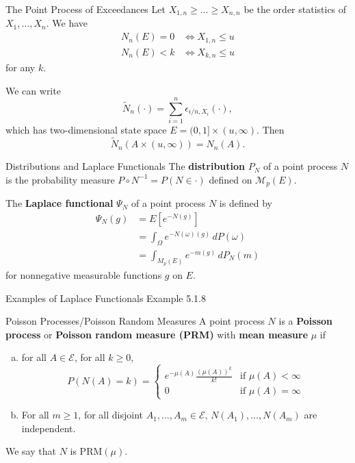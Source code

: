 \documentclass{beamer}
\begin{document}
\begin{frame}{The Point Process of Exceedances}
    Let $X_{1, n} \ge \ldots \ge X_{n, n}$ be the order statistics of $X_1, \ldots, X_n$. We have
    \begin{align*}
        N_n(E) = 0 &\iff X_{1, n} \le u \\
        N_n(E) < k &\iff X_{k, n} \le u
    \end{align*}
    for any $k$.

    \smallskip

    We can write
    \[
    \tilde{N}_n(\cdot) = \sum_{i = 1}^n \epsilon_{i / n, X_i}(\cdot),
    \]
    which has two-dimensional state space $E = (0, 1] \times (u, \infty)$. Then
    \[
    \tilde{N}_n(A \times (u, \infty)) = N_n(A).
    \]
\end{frame}

\begin{frame}{Distributions and Laplace Functionals}
    The \textbf{distribution} $P_N$ of a point process $N$ is the probability measure $P \circ N^{-1} = P(N \in \cdot)$ defined on $\mathcal{M}_p(E)$.

    \smallskip

    The \textbf{Laplace functional} $\Psi_N$ of a point process $N$ is defined by
    \begin{align*}
        \Psi_N(g) &= E[e^{-N(g)}] \\
        &= \int_{\Omega} e^{-N(\omega)(g)}\,dP(\omega) \\
        &= \int_{M_p(E)} e^{-m(g)}\,dP_N(m)
    \end{align*}
    for nonnegative measurable functions $g$ on $E$.
\end{frame}

\begin{frame}{Examples of Laplace Functionals}
    Example 5.1.8
\end{frame}

\begin{frame}{Poisson Processes/Poisson Random Measures}
    A point process $N$ is a \textbf{Poisson process} or \textbf{Poisson random measure (PRM)} with \textbf{mean measure} $\mu$ if
    \begin{enumerate}[(a)]
    \item for all $A \in \mathcal{E}$, for all $k \ge 0$,
    \[
    P(N(A) = k) =
        \begin{cases}
            e^{-\mu(A)}\frac{(\mu(A))^k}{k!} & \text{if $\mu(A) < \infty$} \\
            0 & \text{if $\mu(A) = \infty$}
        \end{cases}
    \]
    \item For all $m \ge 1$, for all disjoint $A_1, \ldots, A_m \in \mathcal{E}$, $N(A_1), \ldots, N(A_m)$ are independent.
    \end{enumerate}
    We say that $N$ is $\text{PRM}(\mu)$.
\end{frame}
\end{document}

